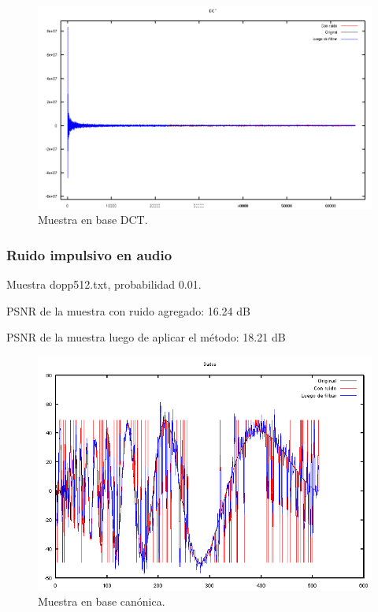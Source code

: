 \documentclass[a4paper,10pt,twoside]{article}
\begin{document}
\begin{figure}[H]
  \centering
  \includegraphics[width=15cm]{graficos/lena_aditivo_atenuar_dct.png} 
  \caption{Muestra en base DCT.}
\end{figure}


\subsubsection{Ruido impulsivo en audio}

Muestra dopp512.txt, probabilidad 0.01.

PSNR de la muestra con ruido agregado: 16.24 dB

PSNR de la muestra luego de aplicar el método: 18.21 dB

\begin{figure}[H]
  \centering
  \includegraphics[width=15cm]{graficos/dopp_impulsivo_atenuar_muestra.png} 
  \caption{Muestra en base canónica.}
\end{figure}
\end{document}
